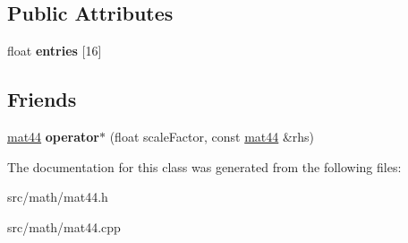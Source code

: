 \subsection*{Public Attributes}
\begin{DoxyCompactItemize}
\item 
\hypertarget{classmath_1_1mat44_af297e18a00ee4038ff621fc00f429a16}{
float {\bfseries entries} \mbox{[}16\mbox{]}}
\label{classmath_1_1mat44_af297e18a00ee4038ff621fc00f429a16}

\end{DoxyCompactItemize}
\subsection*{Friends}
\begin{DoxyCompactItemize}
\item 
\hypertarget{classmath_1_1mat44_aa9d34855a19abf304f53bf8bdc5d1d5d}{
\hyperlink{classmath_1_1mat44}{mat44} {\bfseries operator$\ast$} (float scaleFactor, const \hyperlink{classmath_1_1mat44}{mat44} \&rhs)}
\label{classmath_1_1mat44_aa9d34855a19abf304f53bf8bdc5d1d5d}

\end{DoxyCompactItemize}


The documentation for this class was generated from the following files:\begin{DoxyCompactItemize}
\item 
src/math/mat44.h\item 
src/math/mat44.cpp\end{DoxyCompactItemize}
